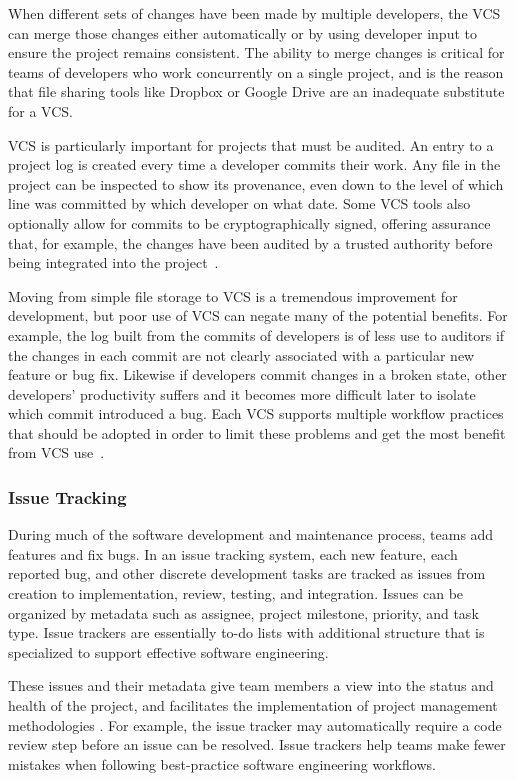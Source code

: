 When different sets of changes have been made by multiple developers,
the VCS can merge those changes either automatically or by using
developer input to ensure the project remains consistent. The ability
to merge changes is critical for teams of developers who work
concurrently on a single project, and is the reason that file sharing
tools like Dropbox or Google Drive are an inadequate substitute for a
VCS.

VCS is particularly important for projects that must be audited. An
entry to a project log is created every time a developer commits their
work. Any file in the project can be inspected to show its provenance,
even down to the level of which line was committed by which developer
on what date. Some VCS tools also optionally allow for commits to be
cryptographically signed, offering assurance that, for example, the
changes have been audited by a trusted authority before being
integrated into the project~\cite{chacon2014pro}.

Moving from simple file storage to VCS is a tremendous improvement for
development, but poor use of VCS can negate many of the potential
benefits. For example, the log built from the commits of developers is
of less use to auditors if the changes in each commit are not clearly
associated with a particular new feature or bug fix. Likewise if
developers commit changes in a broken state, other developers'
productivity suffers and it becomes more difficult later to isolate
which commit introduced a bug. Each VCS supports multiple workflow
practices that should be adopted in order to limit these problems and
get the most benefit from VCS
use~\cite{atlassianworkflow}\cite{pilato2008version}.

\subsubsection{Issue Tracking}

During much of the software development and maintenance process, teams
add features and fix bugs. In an issue tracking system, each new
feature, each reported bug, and other discrete development tasks are
tracked as issues from creation to implementation, review, testing,
and integration. Issues can be organized by metadata such as assignee,
project milestone, priority, and task type. Issue trackers are
essentially to-do lists with additional structure that is specialized
to support effective software engineering.

These issues and their metadata give team members a view into the
status and health of the project, and facilitates the implementation
of project management methodologies . For example, the issue tracker may automatically require a
code review step before an issue can be resolved. Issue trackers help
teams make fewer mistakes when following best-practice software
engineering workflows.

